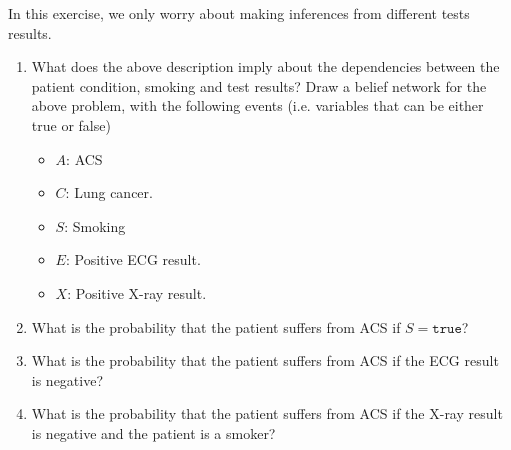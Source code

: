 \documentclass[twoside,a4paper]{article}
\begin{document}
\begin{exercise}
  In this exercise, we only worry about making inferences from different tests results.
  \begin{enumerate}
  \item What does the above description imply about the dependencies between the patient condition, smoking and test results? Draw a belief network for the above problem, with the following events (i.e. variables that can be either true or false)
    \begin{itemize}
    \item $A$: ACS
    \item $C$: Lung cancer.
    \item $S$: Smoking
    \item $E$: Positive ECG result.
    \item $X$: Positive X-ray result.
    \end{itemize}
  \item What is the probability that the patient suffers from ACS if $S = \texttt{true}$?
  \item What is the probability that the patient suffers from ACS if the ECG result is negative?
  \item What is the probability that the patient suffers from ACS if the X-ray result is negative and the patient is a smoker?
  \end{enumerate}
  \label{ex:diagnosis}
\end{exercise}
\end{document}
